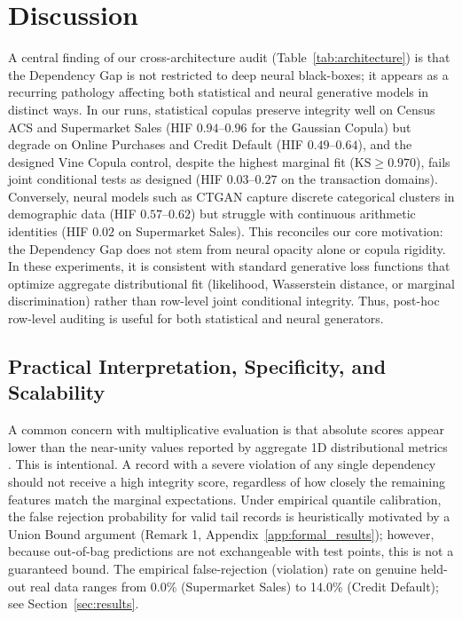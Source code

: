 \documentclass[pdflatex,sn-mathphys-num]{sn-jnl}
\theoremstyle{thmstyleone}%
\theoremstyle{thmstyletwo}%
\theoremstyle{thmstylethree}%
\begin{document}
\section{Discussion}\label{sec:discussion}

A central finding of our cross-architecture audit (Table~\ref{tab:architecture}) is that the Dependency Gap is not restricted to deep neural black-boxes; it appears as a recurring pathology affecting both statistical and neural generative models in distinct ways. In our runs, statistical copulas preserve integrity well on Census ACS and Supermarket Sales (HIF $0.94$--$0.96$ for the Gaussian Copula) but degrade on Online Purchases and Credit Default (HIF $0.49$--$0.64$), and the designed Vine Copula control, despite the highest marginal fit ($\text{KS} \ge 0.970$), fails joint conditional tests as designed (HIF $0.03$--$0.27$ on the transaction domains). Conversely, neural models such as CTGAN capture discrete categorical clusters in demographic data (HIF $0.57$--$0.62$) but struggle with continuous arithmetic identities (HIF $0.02$ on Supermarket Sales). This reconciles our core motivation: the Dependency Gap does not stem from neural opacity alone or copula rigidity. In these experiments, it is consistent with standard generative loss functions that optimize aggregate distributional fit (likelihood, Wasserstein distance, or marginal discrimination) rather than row-level joint conditional integrity. Thus, post-hoc row-level auditing is useful for both statistical and neural generators.

\subsection{Practical Interpretation, Specificity, and Scalability}\label{sec:deployment}

A common concern with multiplicative evaluation is that absolute scores appear lower than the near-unity values reported by aggregate 1D distributional metrics \cite{patki2016synthetic, jordon2022synthetic, long2025evaluating}. This is intentional. A record with a severe violation of any single dependency should not receive a high integrity score, regardless of how closely the remaining features match the marginal expectations. Under empirical quantile calibration, the false rejection probability for valid tail records is heuristically motivated by a Union Bound argument (Remark 1, Appendix~\ref{app:formal_results}); however, because out-of-bag predictions are not exchangeable with test points, this is not a guaranteed bound. The empirical false-rejection (violation) rate on genuine held-out real data ranges from 0.0\% (Supermarket Sales) to 14.0\% (Credit Default); see Section~\ref{sec:results}.
\end{document}
